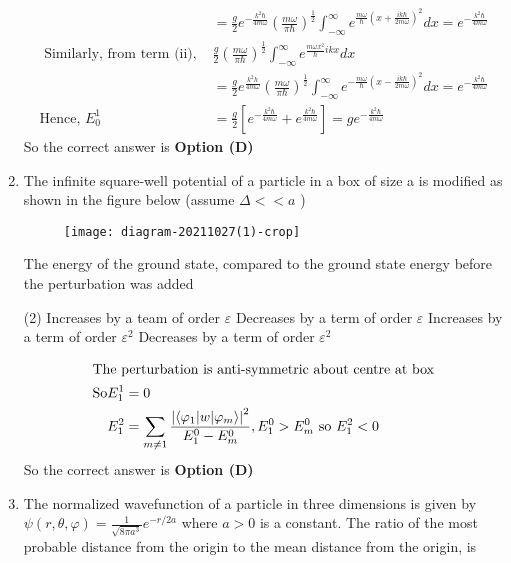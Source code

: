 \begin{enumerate}
\begin{answer}
\begin{align*}
&=\frac{g}{2} e^{-\frac{k^{2} \hbar}{4 m \omega}}\left(\frac{m \omega}{\pi \hbar}\right)^{\frac{1}{2}} \int_{-\infty}^{\infty} e^{\frac{m \omega}{\hbar}\left(x+\frac{i k \hbar}{2 m \omega}\right)^{2}} d x=e^{-\frac{k^{2} \hbar}{4 m \omega}}\\
\text{	Similarly, from term (ii), }&\frac{g}{2}\left(\frac{m \omega}{\pi \hbar}\right)^{\frac{1}{2}} \int_{-\infty}^{\infty} e^{\frac{m \omega x^{2}}{\hbar} i k x} d x\\
&=\frac{g}{2} e^{\frac{k^{2} h}{4 m \omega}}\left(\frac{m \omega}{\pi \hbar}\right)^{\frac{1}{2}} \int_{-\infty}^{\infty} e^{-\frac{m \omega}{\hbar}\left(x-\frac{i k \hbar}{2 m \omega}\right)^{2}} d x=e^{-\frac{k^{2} \hbar}{4 m \omega}}\\
\text{Hence, }E_{0}^{1}&=\frac{g}{2}\left[e^{-\frac{k^{2} \hbar}{4 m \omega}}+e^{\frac{k^{2} \hbar}{4 m \omega}}\right]=g e^{-\frac{k^{2} \hbar}{4 m \omega}}
\end{align*}
So the correct answer is \textbf{Option (D)}
\end{answer}	
\item The infinite square-well potential of a particle in a box of size a is modified as shown in the figure below (assume $\Delta<<a$ )\\
\begin{figure}[H]
	\centering
	\texttt{[image: diagram-20211027(1)-crop]}
\end{figure}
The energy of the ground state, compared to the ground state energy before the perturbation was added
{}
\begin{tasks}(2)
\task[\textbf{A.}] Increases by a team of order $\varepsilon$
\task[\textbf{B.}] Decreases by a term of order $\varepsilon$
\task[\textbf{C.}] Increases by a term of order $\varepsilon^{2}$
\task[\textbf{D.}] Decreases by a term of order $\varepsilon^{2}$
\end{tasks}
\begin{answer}
\begin{align*}
\intertext{The perturbation is anti-symmetric about centre at box}
\mathrm{So} E_{1}^{1}&=0\\
E_{1}^{2}&=\sum_{m \neq 1} \frac{\left|\left\langle\varphi_{1}|w| \varphi_{m}\right\rangle\right|^{2}}{E_{1}^{0}-E_{m}^{0}}, E_{1}^{0}>E_{m}^{0}\text{ so } E_{1}^{2}<0
\end{align*}
So the correct answer is \textbf{Option (D)}
\end{answer}	
\item The normalized wavefunction of a particle in three dimensions is given by $\psi(r, \theta, \varphi)=\frac{1}{\sqrt{8 \pi a^{3}}} e^{-r / 2 a}$ where $a>0$ is a constant. The ratio of the most probable distance from the origin to the mean distance from the origin, is

\end{enumerate}

